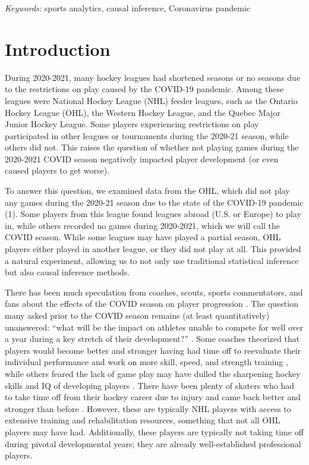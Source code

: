\documentclass[12pt]{article}
\begin{document}
\noindent%
{\it Keywords:} sports analytics, causal inference, Coronavirus pandemic
\vfill

\newpage
{} %

\hypertarget{introduction}{%
\section{Introduction}\label{introduction}}

During 2020-2021, many hockey leagues had shortened seasons or no
seasons due to the restrictions on play caused by the COVID-19 pandemic.
Among these leagues were National Hockey League (NHL) feeder leagues,
such as the Ontario Hockey League (OHL), the Western Hockey League, and
the Quebec Major Junior Hockey League. Some players experiencing
restrictions on play participated in other leagues or tournaments during
the 2020-21 season, while others did not. This raises the question of
whether not playing games during the 2020-2021 COVID season negatively
impacted player development (or even caused players to get worse).

To answer this question, we examined data from the OHL, which did not
play any games during the 2020-21 season due to the state of the
COVID-19 pandemic (1). Some players from this league found leagues
abroad (U.S. or Europe) to play in, while others recorded no games
during 2020-2021, which we will call the COVID season. While some
leagues may have played a partial season, OHL players either played in
another league, or they did not play at all. This provided a natural
experiment, allowing us to not only use traditional statistical
inference but also causal inference methods.

There has been much speculation from coaches, scouts, sports
commentators, and fans about the effects of the COVID season on player
progression \cite{sportsnet, traikos}. The question many asked prior to
the COVID season remains (at least quantitatively) unanswered: ``what
will be the impact on athletes unable to compete for well over a year
during a key stretch of their development?'' \citet{sportsnet}. Some
coaches theorized that players would become better and stronger having
had time off to reevaluate their individual performance and work on more
skill, speed, and strength training \citet{sportsnet}, while others
feared the lack of game play may have dulled the sharpening hockey
skills and IQ of developing players \citet{traikos}. There have been
plenty of skaters who had to take time off from their hockey career due
to injury and came back better and stronger than before
\cite{dixon, kreiser}. However, these are typically NHL players with
access to extensive training and rehabilitation resources, something
that not all OHL players may have had. Additionally, these players are
typically not taking time off during pivotal developmental years; they
are already well-established professional players.
\end{document}
